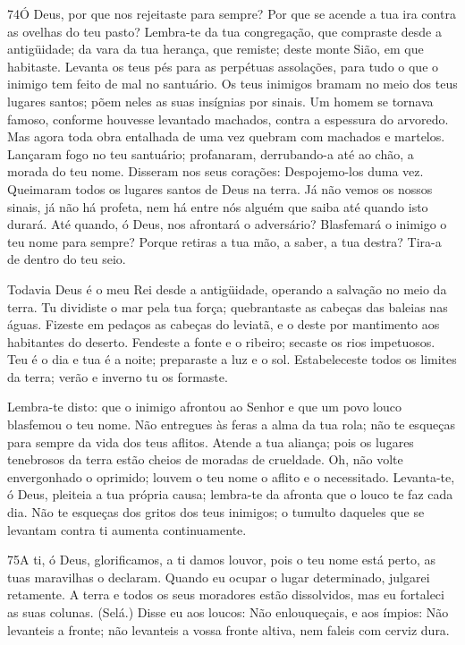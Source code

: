 \bigskip

\lettrine{74}{}Ó Deus, por que nos rejeitaste para sempre? Por
que se acende a tua ira contra as ovelhas do teu pasto?
Lembra-te da tua congregação, que compraste desde a antigüidade;
da vara da tua herança, que remiste; deste monte Sião, em que
habitaste. Levanta os teus pés para as perpétuas assolações,
para tudo o que o inimigo tem feito de mal no santuário. Os teus
inimigos bramam no meio dos teus lugares santos; põem neles as suas
insígnias por sinais. Um homem se tornava famoso, conforme
houvesse levantado machados, contra a espessura do arvoredo. Mas
agora toda obra entalhada de uma vez quebram com machados e
martelos. Lançaram fogo no teu santuário; profanaram,
derrubando-a até ao chão, a morada do teu nome. Disseram nos
seus corações: Despojemo-los duma vez. Queimaram todos os lugares
santos de Deus na terra. Já não vemos os nossos sinais, já não
há profeta, nem há entre nós alguém que saiba até quando isto
durará. Até quando, ó Deus, nos afrontará o adversário?
Blasfemará o inimigo o teu nome para sempre? Porque retiras a
tua mão, a saber, a tua destra? Tira-a de dentro do teu seio.

Todavia Deus é o meu Rei desde a antigüidade, operando a salvação
no meio da terra. Tu dividiste o mar pela tua força;
quebrantaste as cabeças das baleias nas águas. Fizeste em
pedaços as cabeças do leviatã, e o deste por mantimento aos
habitantes do deserto. Fendeste a fonte e o ribeiro; secaste
os rios impetuosos. Teu é o dia e tua é a noite; preparaste a
luz e o sol. Estabeleceste todos os limites da terra; verão e
inverno tu os formaste.

Lembra-te disto: que o inimigo afrontou ao Senhor e que um povo
louco blasfemou o teu nome. Não entregues às feras a alma da
tua rola; não te esqueças para sempre da vida dos teus aflitos.
Atende a tua aliança; pois os lugares tenebrosos da terra
estão cheios de moradas de crueldade. Oh, não volte
envergonhado o oprimido; louvem o teu nome o aflito e o necessitado.
Levanta-te, ó Deus, pleiteia a tua própria causa; lembra-te
da afronta que o louco te faz cada dia. Não te esqueças dos
gritos dos teus inimigos; o tumulto daqueles que se levantam contra
ti aumenta continuamente.

\bigskip

\lettrine{75}{}A ti, ó Deus, glorificamos, a ti damos louvor,
pois o teu nome está perto, as tuas maravilhas o declaram.
Quando eu ocupar o lugar determinado, julgarei retamente. A
terra e todos os seus moradores estão dissolvidos, mas eu fortaleci
as suas colunas. (Selá.) Disse eu aos loucos: Não enlouqueçais,
e aos ímpios: Não levanteis a fronte; não levanteis a vossa
fronte altiva, nem faleis com cerviz dura.

